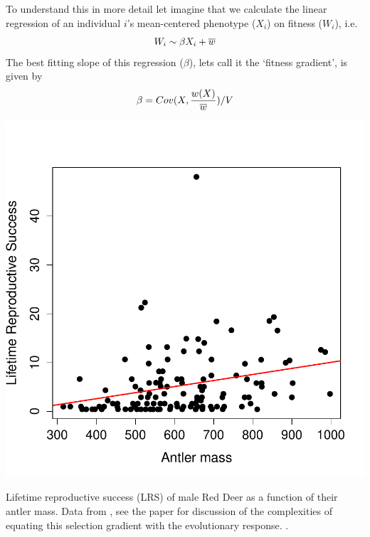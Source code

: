 To understand this in more detail let imagine that we calculate the
linear regression of an individual $i$'s mean-centered phenotype ($X_i$) on fitness ($W_i$), i.e. 
\begin{equation}
W_i \sim \beta X_i + \overline{w} \label{fitness_regression}
\end{equation}  
The best fitting slope of this regression ($\beta$), lets call it the
`fitness gradient', is given by
\begin{equation}
  \beta = Cov(X, \frac{w(X)}{\overline{w}} )/ V  \label{beta_covar}
\end{equation}
\begin{marginfigure}
\begin{center}
\includegraphics[width= \textwidth]{Journal_figs/Quant_gen/red_deer_selection_gradient/selection_grad_deer.pdf}
\end{center}
\caption{Lifetime reproductive success (LRS) of male Red Deer as a
  function of their antler mass. Data from \citet{kruuk2002antler},
  see the paper for discussion of the complexities of equating this
  selection gradient with the evolutionary response. . } \label{fig:red_deer_fitness_grad}  
\end{marginfigure}

